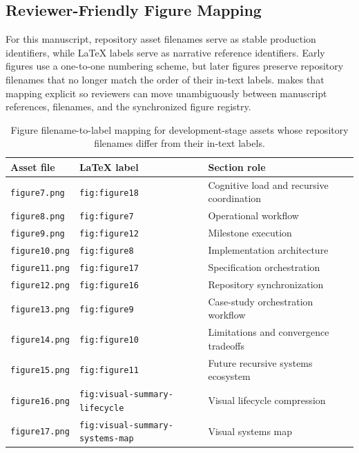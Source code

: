 \subsection{Reviewer-Friendly Figure Mapping}

For this manuscript, repository asset filenames serve as stable production identifiers, while \LaTeX{} labels serve as narrative reference identifiers. Early figures use a one-to-one numbering scheme, but later figures preserve repository filenames that no longer match the order of their in-text labels.  makes that mapping explicit so reviewers can move unambiguously between manuscript references, filenames, and the synchronized figure registry.

\begin{table}[H]
  \centering
  \small
  \caption{Figure filename-to-label mapping for development-stage assets whose repository filenames differ from their in-text labels.}
  \label{tab:figure-mapping}
  \begin{tabularx}{\linewidth}{l l X}
    \toprule
    \textbf{Asset file} & \textbf{LaTeX label} & \textbf{Section role} \\
    \midrule
    \texttt{figure7.png} & \texttt{fig:figure18} & Cognitive load and recursive coordination \\
    \texttt{figure8.png} & \texttt{fig:figure7} & Operational workflow \\
    \texttt{figure9.png} & \texttt{fig:figure12} & Milestone execution \\
    \texttt{figure10.png} & \texttt{fig:figure8} & Implementation architecture \\
    \texttt{figure11.png} & \texttt{fig:figure17} & Specification orchestration \\
    \texttt{figure12.png} & \texttt{fig:figure16} & Repository synchronization \\
    \texttt{figure13.png} & \texttt{fig:figure9} & Case-study orchestration workflow \\
    \texttt{figure14.png} & \texttt{fig:figure10} & Limitations and convergence tradeoffs \\
    \texttt{figure15.png} & \texttt{fig:figure11} & Future recursive systems ecosystem \\
    \texttt{figure16.png} & \texttt{fig:visual-summary-lifecycle} & Visual lifecycle compression \\
    \texttt{figure17.png} & \texttt{fig:visual-summary-systems-map} & Visual systems map \\
    \bottomrule
  \end{tabularx}
\end{table}

